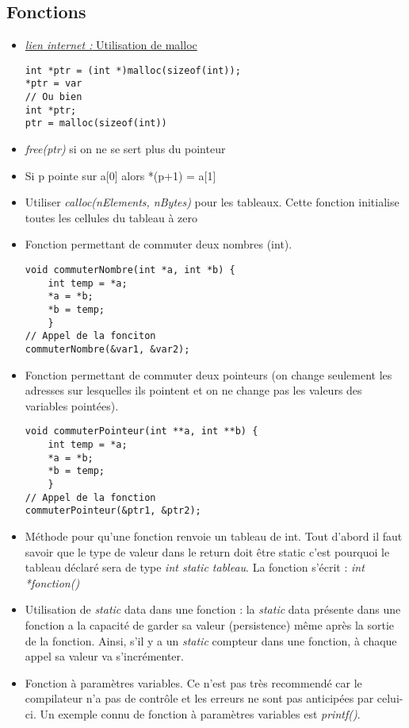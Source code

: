 \documentclass[12pt,a4paper]{article}
\begin{document}
\subsection{Fonctions}
\begin{itemize}
\item \href{https://www.codingunit.com/c-tutorial-the-functions-malloc-and-free}{\textit{lien internet : }Utilisation de malloc}
\begin{lstlisting}
int *ptr = (int *)malloc(sizeof(int)); 
*ptr = var
// Ou bien
int *ptr; 
ptr = malloc(sizeof(int))
\end{lstlisting}
\item \textit{free(ptr)} si on ne se sert plus du pointeur
\item Si p pointe sur a[0] alors *(p+1) = a[1]
\item Utiliser \textit{calloc(nElements, nBytes)} pour les tableaux. Cette fonction initialise toutes les cellules du tableau à zero
\item Fonction permettant de commuter deux nombres (int).
\begin{lstlisting}
void commuterNombre(int *a, int *b) {
	int temp = *a;
	*a = *b;
	*b = temp; 
	}
// Appel de la fonciton
commuterNombre(&var1, &var2);
\end{lstlisting}
\item Fonction permettant de commuter deux pointeurs (on change seulement les adresses sur lesquelles ils pointent et on ne change pas les valeurs des variables pointées).
\begin{lstlisting}
void commuterPointeur(int **a, int **b) {
	int temp = *a;
	*a = *b;
	*b = temp; 
	}
// Appel de la fonction
commuterPointeur(&ptr1, &ptr2);
\end{lstlisting}
\item Méthode pour qu'une fonction renvoie un tableau de int. Tout d'abord il faut savoir que le type de valeur dans le return doit être static c'est pourquoi le tableau déclaré sera de type \textit{int static tableau}. La fonction s'écrit : \textit{int *fonction()}
\item Utilisation de \textit{static} data dans une fonction : la \textit{static} data présente dans une fonction a la capacité de garder sa valeur (persistence) même après la sortie de la fonction. Ainsi, s’il y a un \textit{static} compteur dans une fonction, à chaque appel sa valeur va s’incrémenter.
\item Fonction à paramètres variables. Ce n’est pas très recommendé car le compilateur n’a pas de contrôle et les erreurs ne sont pas anticipées par celui-ci. Un exemple connu de fonction à paramètres variables est \textit{printf()}.

\end{itemize}
\end{document}
